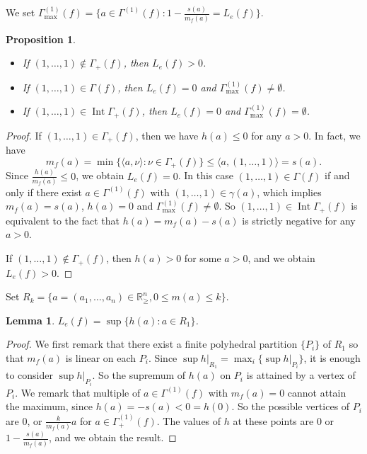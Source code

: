 \documentclass[12pt,a4paper,leqno]{amsart}
\newtheorem{lem}[thm]{Lemma}
\newtheorem{prop}[thm]{Proposition}
\theoremstyle{definition}
\begin{document}
We set  
$\Gamma^{(1)}_{\max}(f)
=\bigl\{a\in\Gamma^{(1)}(f):1-\frac{s(a)}{m_f(a)}=L_e(f)\bigr\}$. 

\begin{prop}\label{1111} \
\begin{itemize}
\item If $(1,\dots,1)\not\in\Gamma_+(f)$, then $L_e(f)>0$. 
\item If $(1,\dots,1)\in\Gamma(f)$, then $L_e(f)=0$ 
and $\Gamma^{(1)}_{\max}(f)\ne\emptyset$. 
\item If $(1,\dots,1)\in{\mathop{\mathrm{Int}}\nolimits}\Gamma_+(f)$, then $L_e(f)=0$ 
and $\Gamma^{(1)}_{\max}(f)=\emptyset$. 
\end{itemize}
\end{prop}

\begin{proof}
If $(1,\dots,1)\in\Gamma_+(f)$, then we have $h(a)\le0$ 
for any $a>0$. In fact, we have 
$$
m_f(a)=\min\{\langle a,\nu\rangle:\nu\in\Gamma_+(f)\}
\le\langle a,(1,\dots,1)\rangle=s(a).
$$
Since $\frac{h(a)}{m_f(a)}\le0$, we obtain $L_e(f)=0$. 
In this case $(1,\dots,1)\in\Gamma(f)$ if and only if 
there exist $a\in\Gamma^{(1)}(f)$ with $(1,\dots,1)\in\gamma(a)$, 
which implies $m_f(a)=s(a)$, $h(a)=0$ and 
$\Gamma^{(1)}_{\max}(f)\ne\emptyset$.
So $(1,\dots,1)\in{\mathop{\mathrm{Int}}\nolimits}\Gamma_+(f)$ is equivalent to the fact that 
$h(a)=m_f(a)-s(a)$ is strictly negative for any $a>0$.

If $(1,\dots,1)\not\in\Gamma_+(f)$, 
then $h(a)>0$ for some $a>0$, and we obtain $L_e(f)>0$.
\end{proof}

Set $R_k=\{a=(a_1,\dots,a_n)\in{\mathbb{R}}_{\ge}^n, 0\le m(a)\le k\}$.

\begin{lem}
$L_e(f)=\sup\{h(a):a\in R_1\}$.
\end{lem}
\begin{proof}
We first remark that there exist a finite polyhedral partition $\{P_i\}$ 
of $R_1$ so that $m_f(a)$ is linear on each $P_i$.  
Since $\sup h|_{R_1}=\max_i\{\sup {h|_{P_i}}\}$, it is enough to consider
 $\sup h|_{P_i}$. 
So the supremum of $h(a)$ on $P_i$ is attained by a vertex of $P_i$. 
We remark that multiple of $a\in\Gamma^{(1)}(f)$ with $m_{f}(a)=0$ 
cannot attain the maximum, since $h(a)=-s(a)<0=h(0)$.   
So the possible vertices of $P_i$ are $0$, or $\frac{k}{m_f(a)}a$
 for $a\in\Gamma^{(1)}_+(f)$.
The values of $h$ at these points are 
$0$ or $1-\frac{s(a)}{m_f(a)}$, and we obtain the result. 
\end{proof}
\end{document}
